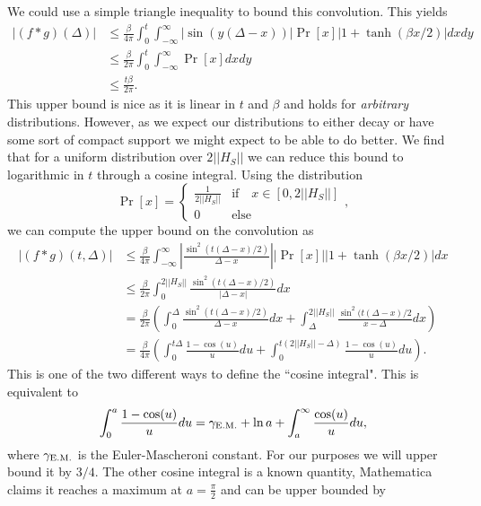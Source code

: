 \documentclass[
 amsmath,amssymb,
 aps,
onecolumn, 
nofootinbib]{revtex4-2}
\newcommand{\abs}[1]{\left| #1 \right|}
\newcommand{\norm}[1]{\left|\left| #1 \right|\right|}
\begin{document}
We could use a simple triangle inequality to bound this convolution. This yields
\begin{align}
    \abs{(f * g) (\Delta)} &\le \frac{\beta}{4 \pi} \int_0^t \int_{-\infty}^{\infty} \abs{\sin(y(\Delta - x))} \Pr[x] \abs{1 + \tanh(\beta x / 2)} dx dy \\
    &\le \frac{\beta}{2\pi} \int_{0}^t \int_{-\infty}^{\infty} \Pr[x] dx dy \\
    &\le \frac{t \beta}{2 \pi}.
\end{align}
This upper bound is nice as it is linear in $t$ and $\beta$ and holds for \emph{arbitrary} distributions. However, as we expect our distributions to either decay or have some sort of compact support we might expect to be able to do better. We find that for a uniform distribution over $2 \norm{H_S}$ we can reduce this bound to logarithmic in $t$ through a cosine integral. Using the distribution
\begin{equation}
    \Pr[x] = \begin{cases}
        \frac{1}{2 \norm{H_S}} & \text{if} \quad x \in [0, 2 \norm{H_S}] \\
        0 & \text{else}
    \end{cases},
\end{equation}
we can compute the upper bound on the convolution as
\begin{align}
    \abs{(f * g)(t, \Delta)} &\le \frac{\beta}{4 \pi} \int_{-\infty}^{\infty} \abs{\frac{\sin^2(t(\Delta - x)/2)}{\Delta - x}} \abs{\Pr[x]} \abs{1 + \tanh(\beta x / 2)} dx \\
    &\le \frac{\beta}{2\pi} \int_{0}^{2\norm{H_S}} \frac{\sin^2(t(\Delta - x)/2)}{\abs{\Delta - x}} dx \\
    &= \frac{\beta}{2 \pi} \left(\int_0^{\Delta} \frac{\sin^2(t(\Delta - x) / 2)}{\Delta - x} dx + \int_{\Delta}^{2 \norm{H_S}} \frac{\sin^2(t(\Delta - x)/2}{x - \Delta}  dx\right) \\
    &=\frac{\beta}{4 \pi} \left( \int_0^{t \Delta} \frac{1 - \cos(u)}{u} du + \int_{0}^{t (2 \norm{H_S} - \Delta)} \frac{1 - \cos (u)}{u} du \right).
\end{align}
This is one of the two different ways to define the ``cosine integral". This is equivalent to
\begin{align}
    \int_{0}^a \frac{1 - \cos(u)}{u} du = \gamma_{\rm E.M.} + \ln a + \int_{a}^{\infty} \frac{\cos(u)}{u}du,
\end{align}
where $\gamma_{\rm E.M.}$ is the Euler-Mascheroni constant. For our purposes we will upper bound it by $3/4$. The other cosine integral is a known quantity, Mathematica claims it reaches a maximum at $a = \frac{\pi}{2}$ and can be upper bounded by 
\end{document}
